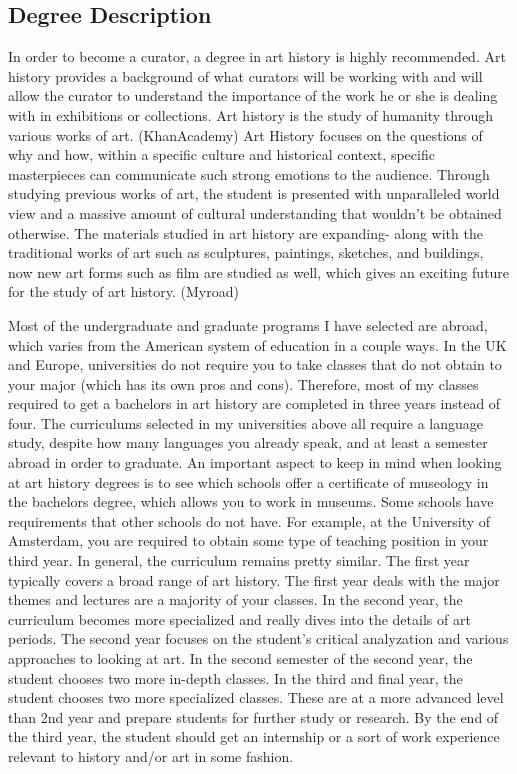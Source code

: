 \begin{multicols}{2}
\section{Degree Description}
	In order to become a curator, a degree in art history is highly recommended. Art history provides a background of what curators will be working with and will allow the curator to understand the importance of the work he or she is dealing with in exhibitions or collections. Art history is the study of humanity through various works of art. (KhanAcademy) Art History focuses on the questions of why and how, within a specific culture and historical context, specific masterpieces can communicate such strong emotions to the audience. Through studying previous works of art, the student is presented with unparalleled world view and a massive amount of cultural understanding that wouldn’t be obtained otherwise. The materials studied in art history are expanding- along with the traditional works of art such as sculptures, paintings, sketches, and buildings, now new art forms such as film are studied as well, which gives an exciting future for the study of art history. (Myroad) 

	Most of the undergraduate and graduate programs I have selected are abroad, which varies from the American system of education in a couple ways. In the UK and Europe, universities do not require you to take classes that do not obtain to your major (which has its own pros and cons). Therefore, most of my classes required to get a bachelors in art history are completed in three years instead of four. The curriculums selected in my universities above all require a language study, despite how many languages you already speak, and at least a semester abroad in order to graduate. An important aspect to keep in mind when looking at art history degrees is to see which schools offer a certificate of museology in the bachelors degree, which allows you to work in museums. Some schools have requirements that other schools do not have. For example, at the University of Amsterdam, you are required to obtain some type of teaching position in your third year. In general, the curriculum remains pretty similar. The first year typically covers a broad range of art history. The first year deals with the major themes and lectures are a majority of your classes. In the second year, the curriculum becomes more specialized and really dives into the details of art periods. The second year focuses on the student’s critical analyzation and various approaches to looking at art. In the second semester of the second year, the student chooses two more in-depth classes. In the third and final year, the student chooses two more specialized classes. These are at a more advanced level than 2nd year and prepare students for further study or research. By the end of the third year, the student should get an internship or a sort of work experience relevant to history and/or art in some fashion. 


\end{multicols}
